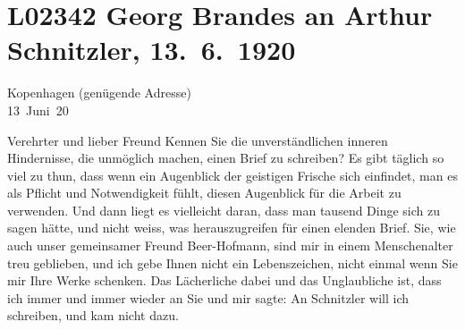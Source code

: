 

\section[Georg Brandes an Arthur Schnitzler, 13. 6. 1920]{L02342 Georg Brandes an Arthur Schnitzler, 13. 6. 1920}
\nopagebreak{}
\rehead{ }\normalsize\beginnumbering{}
\toendnotes[C]{\smallbreak\pagebreak[2]}
\toendnotes[C]{\smallbreak}
\toendnotes[C]{\smallbreak}
\pstart
           \raggedleft{}{\pb}Kopenhagen (genügende Adresse){\\}13 Juni 20\pend
           
\pstart{}Verehrter und lieber Freund\pend\vspace{0.5em}
\pstart
           Kennen Sie die unverständlichen inneren Hindernisse, die \label{T_L02342-1v}\label{T_L02342-1} unmöglich machen,
               einen Brief zu schreiben? Es gibt täglich so viel zu thun, dass wenn ein Augenblick
               der geistigen Frische sich einfindet, man es als Pflicht und Notwendigkeit fühlt,
               diesen Augenblick für die Arbeit zu verwenden. Und dann liegt es vielleicht daran,
               dass man tausend Dinge sich zu sagen hätte, und nicht weiss, was herauszugreifen für
               einen elenden Brief. Sie, wie auch unser gemeinsamer Freund Beer-Hofmann, sind mir in einem Menschenalter treu geblieben,
               und ich gebe Ihnen nicht ein Lebenszeichen, nicht einmal wenn Sie mir Ihre Werke
               schenken. Das Lächerliche dabei und das Unglaubliche ist, {\pb}dass ich immer und immer wieder an
               Sie \label{T_L02342-2v}\label{T_L02342-2} und mir sagte: An Schnitzler will ich schreiben,
               und kam nicht dazu.\pend
           
